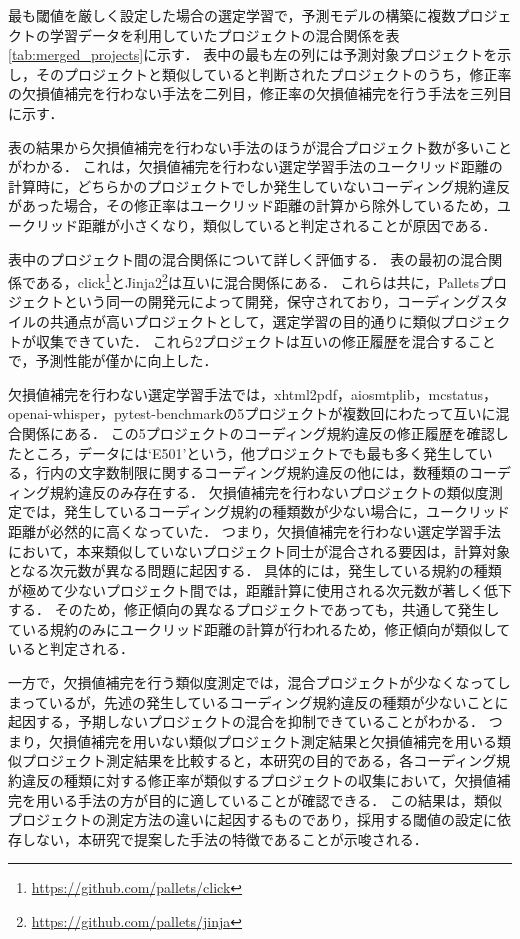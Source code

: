 \documentclass[11pt]{jreport}
\begin{document}
最も閾値を厳しく設定した場合の選定学習で，予測モデルの構築に複数プロジェクトの学習データを利用していたプロジェクトの混合関係を表\ref{tab:merged_projects}に示す．
表中の最も左の列には予測対象プロジェクトを示し，そのプロジェクトと類似していると判断されたプロジェクトのうち，修正率の欠損値補完を行わない手法を二列目，修正率の欠損値補完を行う手法を三列目に示す．

表の結果から欠損値補完を行わない手法のほうが混合プロジェクト数が多いことがわかる．
これは，欠損値補完を行わない選定学習手法のユークリッド距離の計算時に，どちらかのプロジェクトでしか発生していないコーディング規約違反があった場合，その修正率はユークリッド距離の計算から除外しているため，ユークリッド距離が小さくなり，類似していると判定されることが原因である．

表中のプロジェクト間の混合関係について詳しく評価する．
表の最初の混合関係である，click\footnote{\url{https://github.com/pallets/click}}とJinja2\footnote{\url{https://github.com/pallets/jinja}}は互いに混合関係にある．
これらは共に，Palletsプロジェクトという同一の開発元によって開発，保守されており，コーディングスタイルの共通点が高いプロジェクトとして，選定学習の目的通りに類似プロジェクトが収集できていた．
これら2プロジェクトは互いの修正履歴を混合することで，予測性能が僅かに向上した．

欠損値補完を行わない選定学習手法では，xhtml2pdf，aiosmtplib，mcstatus，openai-whisper，pytest-benchmarkの5プロジェクトが複数回にわたって互いに混合関係にある．
この5プロジェクトのコーディング規約違反の修正履歴を確認したところ，データには`E501'という，他プロジェクトでも最も多く発生している，行内の文字数制限に関するコーディング規約違反の他には，数種類のコーディング規約違反のみ存在する．
欠損値補完を行わないプロジェクトの類似度測定では，発生しているコーディング規約の種類数が少ない場合に，ユークリッド距離が必然的に高くなっていた．
つまり，欠損値補完を行わない選定学習手法において，本来類似していないプロジェクト同士が混合される要因は，計算対象となる次元数が異なる問題に起因する．
具体的には，発生している規約の種類が極めて少ないプロジェクト間では，距離計算に使用される次元数が著しく低下する．
そのため，修正傾向の異なるプロジェクトであっても，共通して発生している規約のみにユークリッド距離の計算が行われるため，修正傾向が類似していると判定される．

一方で，欠損値補完を行う類似度測定では，混合プロジェクトが少なくなってしまっているが，先述の発生しているコーディング規約違反の種類が少ないことに起因する，予期しないプロジェクトの混合を抑制できていることがわかる．
つまり，欠損値補完を用いない類似プロジェクト測定結果と欠損値補完を用いる類似プロジェクト測定結果を比較すると，本研究の目的である，各コーディング規約違反の種類に対する修正率が類似するプロジェクトの収集において，欠損値補完を用いる手法の方が目的に適していることが確認できる．
この結果は，類似プロジェクトの測定方法の違いに起因するものであり，採用する閾値の設定に依存しない，本研究で提案した手法の特徴であることが示唆される．
\end{document}
